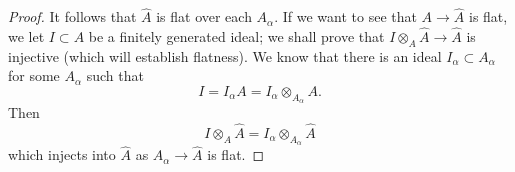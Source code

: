 \begin{proof}
It follows that $\hat{A}$ is flat over each $A_\alpha$. 
If we want to see that $A \to \hat{A}$ is flat, we let $I \subset A$ be a
finitely generated
ideal; we shall prove that $I \otimes_A \hat{A} \to \hat{A}$ is injective
(which will establish flatness). We know that there is an ideal $I_\alpha \subset A_\alpha$ for some
$A_\alpha$ such that
\[ I = I_\alpha A = I_\alpha \otimes_{A_\alpha} A.  \]
Then
\[ I \otimes_A \hat{A} = I_\alpha \otimes_{A_\alpha} \hat{A}  \]
which injects into $\hat{A}$ as $A_\alpha \to \hat{A}$ is flat. 

\begin{comment}
Let us first show that $A$ is \emph{separated} with respect to the
$\mathfrak{m}$-adic topology. Fix $x \in A$. Then $x$ lies in the subring
$A_\alpha$ for some fixed $\alpha$ depending on $\alpha$ (note that $A_\alpha
\to A$ is injective since a flat morphism of local rings is \emph{faithfully
flat}). If $x \in \mathfrak{m}^n = A \mathfrak{m}_\alpha^n$, then $x \in
\mathfrak{m}_\alpha^n$ by faithful flatness and \cref{intideal}.
So if $x \in \mathfrak{m}^n$ for all $n$, then $x \in \mathfrak{m}_\alpha^n$
for all $n$; the separatedness of $A_\alpha$ with respect to the
$\mathfrak{m}_\alpha$-adic topology now shows $x=0$.
\end{comment}


\end{proof} 
